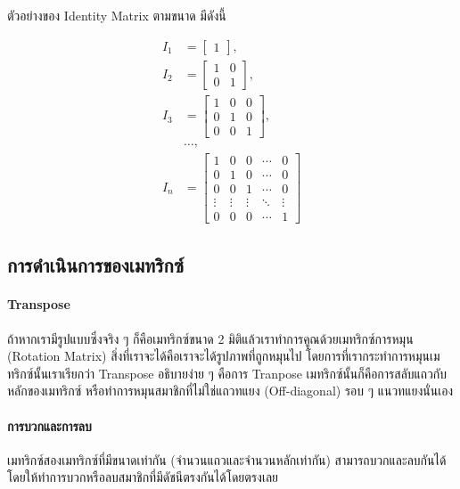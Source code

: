 \noindent ตัวอย่างของ Identity Matrix ตามขนาด มีดังนี้

\begin{align}
    I_1 &= \begin{bmatrix} 1 \end{bmatrix}
    ,\ \\
    I_2 &= \begin{bmatrix}
    1 & 0 \\
    0 & 1 \end{bmatrix}
    ,\ \\
    I_3 &= \begin{bmatrix}
    1 & 0 & 0 \\
    0 & 1 & 0 \\
    0 & 0 & 1 \end{bmatrix}
    ,\ \\ 
    & \dots ,\ \\
    I_n &= \begin{bmatrix}
    1 & 0 & 0 & \cdots & 0 \\
    0 & 1 & 0 & \cdots & 0 \\
    0 & 0 & 1 & \cdots & 0 \\
    \vdots & \vdots & \vdots & \ddots & \vdots \\
    0 & 0 & 0 & \cdots & 1 \end{bmatrix}
\end{align}

\subsection{การดำเนินการของเมทริกซ์}

\paragraph{Transpose} ถ้าหากเรามีรูปแบบซึ่งจริง ๆ ก็คือเมทริกซ์ขนาด 2 มิติแล้วเราทำการคูณด้วยเมทริกซ์การหมุน (Rotation Matrix) 
สิ่งที่เราจะได้คือเราจะได้รูปภาพที่ถูกหมุนไป โดยการที่เรากระทำการหมุนเมทริกซ์นั้นเราเรียกว่า Transpose 
อธิบายง่าย ๆ คือการ Tranpose เมทริกซ์นั้นก็คือการสลับแถวกับหลักของเมทริกซ์ หรือทำการหมุนสมาชิกที่ไม่ใช่แถวทแยง (Off-diagonal) 
รอบ ๆ แนวทแยงนั่นเอง

\paragraph{การบวกและการลบ} เมทริกซ์สองเมทริกซ์ที่มีขนาดเท่ากัน (จำนวนแถวและจำนวนหลักเท่ากัน) สามารถบวกและลบกันได้ 
โดยให้ทำการบวกหรือลบสมาชิกที่มีดัชนีตรงกันได้โดยตรงเลย

